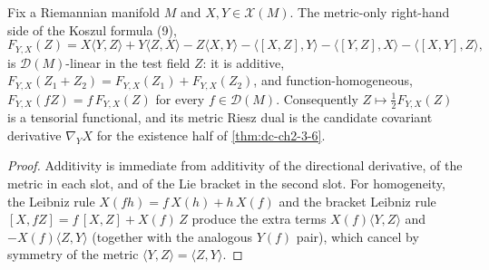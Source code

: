 \begin{lemma}
  \label{lem:dc-ch2-3-6-welldef}
  \leanok
  Fix a Riemannian manifold $M$ and $X, Y \in \mathcal{X}(M)$. The metric-only
  right-hand side of the Koszul formula (9),
  \[
    F_{Y,X}(Z) = X\langle Y,Z\rangle + Y\langle Z,X\rangle - Z\langle X,Y\rangle
      - \langle[X,Z],Y\rangle - \langle[Y,Z],X\rangle - \langle[X,Y],Z\rangle,
  \]
  is $\mathcal{D}(M)$-linear in the test field $Z$: it is additive,
  $F_{Y,X}(Z_1+Z_2) = F_{Y,X}(Z_1) + F_{Y,X}(Z_2)$, and function-homogeneous,
  $F_{Y,X}(fZ) = f\,F_{Y,X}(Z)$ for every $f \in \mathcal{D}(M)$. Consequently
  $Z \mapsto \tfrac12 F_{Y,X}(Z)$ is a tensorial functional, and its metric Riesz
  dual is the candidate covariant derivative $\nabla_Y X$ for the existence half of
  \cref{thm:dc-ch2-3-6}.
\end{lemma}
\begin{proof}
  \leanok
  Additivity is immediate from additivity of the directional derivative, of the
  metric in each slot, and of the Lie bracket in the second slot. For homogeneity,
  the Leibniz rule $X(fh) = f\,X(h) + h\,X(f)$ and the bracket Leibniz rule
  $[X,fZ] = f\,[X,Z] + X(f)\,Z$ produce the extra terms $X(f)\langle Y,Z\rangle$
  and $-X(f)\langle Z,Y\rangle$ (together with the analogous $Y(f)$ pair), which
  cancel by symmetry of the metric $\langle Y,Z\rangle = \langle Z,Y\rangle$.
\end{proof}

